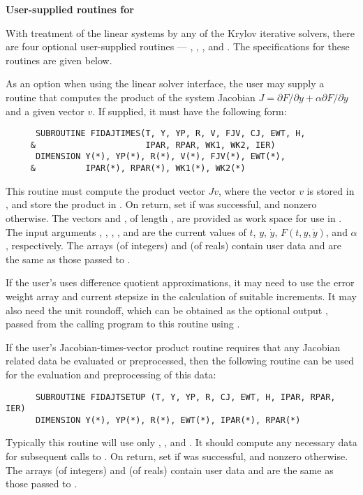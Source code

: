 \begin{Steps}

  {\bf User-supplied routines for {\idaspils}}

  With treatment of the linear systems by any of the Krylov iterative
  solvers, there are four optional user-supplied routines ---
  , , , and .
  The specifications for these routines are given below.

  As an option when using the {\idaspils} linear solver interface, the user may
  supply a routine that computes the product of the system Jacobian
  $J = \partial F / \partial y + \alpha \partial F / \partial \dot{y}$
  and a given vector $v$.  If supplied, it must have the following form:
\begin{verbatim}
      SUBROUTINE FIDAJTIMES(T, Y, YP, R, V, FJV, CJ, EWT, H,
     &                      IPAR, RPAR, WK1, WK2, IER)
      DIMENSION Y(*), YP(*), R(*), V(*), FJV(*), EWT(*),
     &          IPAR(*), RPAR(*), WK1(*), WK2(*)
\end{verbatim}
  This routine must compute the product vector $Jv$, where the vector $v$ is
  stored in , and store the product in .  On return, set
   if  was successful, and nonzero otherwise.
  The vectors  and , of length , are
  provided as work space for use in .
  The input arguments , , , , and  are the
  current values of $t$, $y$, $\dot{y}$, $F(t,y,\dot{y})$, and $\alpha$, respectively.
  The arrays  (of integers) and  (of reals) contain user data
  and are the same as those passed to .

  If the user's  uses difference quotient approximations, it
  may need to use the error weight array  and current stepsize 
  in the calculation of suitable increments.  It may also need the unit
  roundoff, which can be obtained as the optional output ,
  passed from the calling program to this routine using .

  If the user's Jacobian-times-vector product routine requires that
  any Jacobian related data be evaluated or preprocessed, then the
  following routine can be used for the evaluation and preprocessing
  of this data:
\begin{verbatim}
      SUBROUTINE FIDAJTSETUP (T, Y, YP, R, CJ, EWT, H, IPAR, RPAR, IER)
      DIMENSION Y(*), YP(*), R(*), EWT(*), IPAR(*), RPAR(*)
\end{verbatim}
  Typically this routine will use only , , and .  It should
  compute any necessary data for subsequent calls to .  On return, set
   if  was successful, and nonzero otherwise.
  The arrays  (of integers) and  (of reals) contain user data
  and are the same as those passed to .


\end{Steps}
